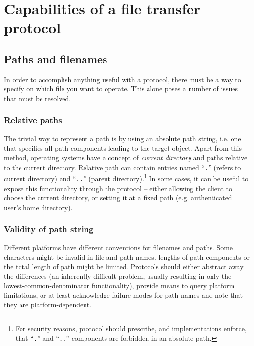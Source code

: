 
\section{Capabilities of a file transfer protocol}

\subsection{Paths and filenames}

In order to accomplish anything useful with a protocol, there must be a way to specify on which file you want
to operate. This alone poses a number of issues that must be resolved.

\subsubsection{Relative paths}

The trivial way to represent a path is by using an absolute path string, i.e. one that specifies all path
components leading to the target object. Apart from this method, operating systems have a concept of {\it
current directory} and paths relative to the current directory. Relative path can contain entries named
``\texttt{.}'' (refers to current directory) and ``\texttt{..}'' (parent directory).\footnote{For security
reasons, protocol should prescribe, and implementations enforce, that ``\texttt{.}'' and ``\texttt{..}''
components are forbidden in an absolute path.} In some cases, it can be useful to expose this functionality
through the protocol -- either allowing the client to choose the current directory, or setting it at a fixed
path (e.g.  authenticated user's home directory).

\subsubsection{Validity of path string}

Different platforms have different conventions for filenames and paths. Some characters might be invalid in
file and path names, lengths of path components or the total length of path might be limited. Protocols should
either abstract away the differences (an inherently difficult problem, usually resulting in only the
lowest-common-denominator functionality), provide means to query platform limitations, or at least acknowledge
failure modes for path names and note that they are platform-dependent.

